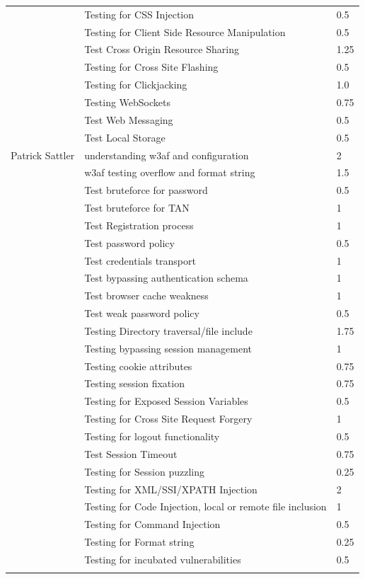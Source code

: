 \documentclass[headsepline,footsepline,footinclude=false,oneside,fontsize=11pt,paper=a4,listof=totoc,bibliography=totoc]{scrbook} %
\begin{document}
\begin{table}[htb]
{\begin{tabular}{lll}
		& Testing for CSS Injection & 0.5 \\
		& Testing for Client Side Resource Manipulation & 0.5 \\
		& Test Cross Origin Resource Sharing & 1.25 \\
		& Testing for Cross Site Flashing & 0.5 \\
		& Testing for Clickjacking & 1.0 \\
		& Testing WebSockets & 0.75 \\
		& Test Web Messaging & 0.5 \\
		& Test Local Storage & 0.5 \\
		\hline
		\hline
		Patrick Sattler & understanding w3af and configuration & 2 \\
		& w3af testing overflow and format string & 1.5 \\
		& Test bruteforce for password & 0.5 \\
		& Test bruteforce for TAN & 1 \\
		& Test Registration process & 1 \\
		& Test password policy & 0.5 \\
		& Test credentials transport & 1 \\
		& Test bypassing authentication schema & 1 \\
		& Test browser cache weakness & 1 \\
		& Test weak password policy & 0.5 \\
		& Testing Directory traversal/file include & 1.75 \\
		& Testing bypassing session management & 1 \\
		& Testing cookie attributes & 0.75 \\
		& Testing session fixation & 0.75 \\
		& Testing for Exposed Session Variables & 0.5 \\
		& Testing for Cross Site Request Forgery & 1 \\
		& Testing for logout functionality & 0.5 \\
		& Test Session Timeout & 0.75 \\
		& Testing for Session puzzling & 0.25 \\
		& Testing for XML/SSI/XPATH Injection & 2 \\
		& Testing for Code Injection, local or remote file inclusion & 1 \\
		& Testing for Command Injection & 0.5 \\
		& Testing for Format string & 0.25 \\
		& Testing for incubated vulnerabilities & 0.5 \\
		 &  &
	\end{tabular}%
}
\end{table}
\end{document}
